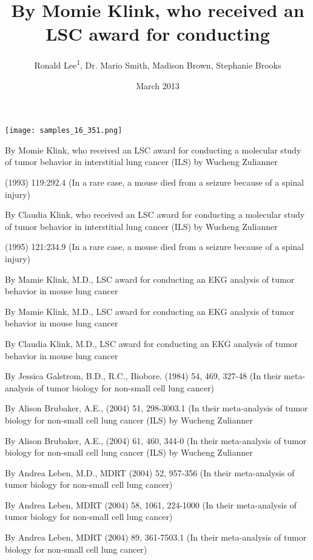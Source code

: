 \documentclass{article}
\title{By Momie Klink, who received an LSC award for conducting}
\author{Ronald Lee\textsuperscript{1},  Dr. Mario Smith,  Madison Brown,  Stephanie Brooks}
\affil{\textsuperscript{1}Bhabha Atomic Research Centre}
\date{March 2013}
\begin{document}
\maketitle

\begin{center}
\begin{minipage}{0.75\linewidth}
\texttt{[image: samples\_16\_351.png]}
\end{minipage}
\end{center}

By Momie Klink, who received an LSC award for conducting a molecular study of tumor behavior in interstitial lung cancer (ILS) by Wucheng Zulianner

(1993) 119:292.4 (In a rare case, a mouse died from a seizure because of a spinal injury)

By Claudia Klink, who received an LSC award for conducting a molecular study of tumor behavior in interstitial lung cancer (ILS) by Wucheng Zulianner

(1995) 121:234.9 (In a rare case, a mouse died from a seizure because of a spinal injury)

By Mamie Klink, M.D., LSC award for conducting an EKG analysis of tumor behavior in mouse lung cancer

By Mamie Klink, M.D., LSC award for conducting an EKG analysis of tumor behavior in mouse lung cancer

By Claudia Klink, M.D., LSC award for conducting an EKG analysis of tumor behavior in mouse lung cancer

By Jessica Galstrom, B.D., R.C., Biobore. (1984) 54, 469, 327-48 (In their meta-analysis of tumor biology for non-small cell lung cancer)

By Alison Brubaker, A.E., (2004) 51, 298-3003.1 (In their meta-analysis of tumor biology for non-small cell lung cancer (ILS) by Wucheng Zulianner

By Alison Brubaker, A.E., (2004) 61, 460, 344-0 (In their meta-analysis of tumor biology for non-small cell lung cancer (ILS) by Wucheng Zulianner

By Andrea Leben, M.D., MDRT (2004) 52, 957-356 (In their meta-analysis of tumor biology for non-small cell lung cancer)

By Andrea Leben, MDRT (2004) 58, 1061, 224-1000 (In their meta-analysis of tumor biology for non-small cell lung cancer)

By Andrea Leben, MDRT (2004) 89, 361-7503.1 (In their meta-analysis of tumor biology for non-small cell lung cancer)
\end{document}
